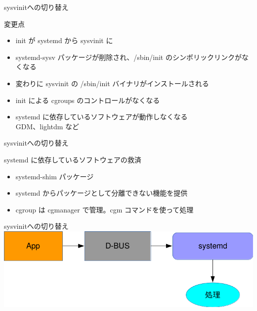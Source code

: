 

\begin{frame}{sysvinitへの切り替え}

変更点
\begin{itemize}
\item init が systemd から sysvinit に
\item systemd-sysv パッケージが削除され、/sbin/init のシンボリックリンクがなくなる
\item 変わりに sysvinit の /sbin/init バイナリがインストールされる
\item init による cgroups のコントロールがなくなる
\item systemd に依存しているソフトウェアが動作しなくなる\\
	GDM、lightdm など
\end{itemize}

\end{frame}

\begin{frame}[containsverbatim]{sysvinitへの切り替え}

systemd に依存しているソフトウェアの救済

\begin{itemize}
\item systemd-shim パッケージ
\item systemd からパッケージとして分離できない機能を提供
\item cgroup は cgmanager で管理。cgm コマンドを使って処理

\end{itemize}

\end{frame}

\begin{frame}{sysvinitへの切り替え}
\includegraphics[width=1\hsize]{image201510/shim0.png}
\end{frame}

